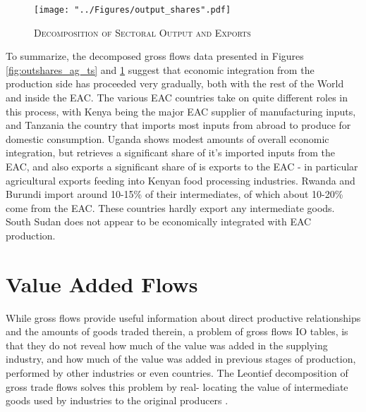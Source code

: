 \documentclass[a4paper]{article}
\begin{document}
\begin{figure}[!h]
\centering
\vspace{-2cm}
\caption{\label{fig:outshares}\textsc{Decomposition of Sectoral Output and Exports}}
\vspace*{\fill}
\begin{adjustbox}{center}
\texttt{[image: "../Figures/output\_shares".pdf]} %
\end{adjustbox}
\vspace*{\fill}
\end{figure}
\FloatBarrier

To summarize, the decomposed gross flows data presented in Figures \ref{fig:outshares_ag_ts} and \ref{fig:outshares} suggest that economic integration from the production side has proceeded very gradually, both with the rest of the World and inside the EAC. The various EAC countries take on quite different roles in this process, with Kenya being the major EAC supplier of manufacturing inputs, and Tanzania the country that imports most inputs from abroad to produce for domestic consumption. Uganda shows modest amounts of overall economic integration, but retrieves a significant share of it's imported inputs from the EAC, and also exports a significant share of is exports to the EAC - in particular agricultural exports feeding into Kenyan food processing industries. Rwanda and Burundi import around 10-15\% of their intermediates, of which about 10-20\% come from the EAC. These countries hardly export any intermediate goods. South Sudan does not appear to be economically integrated with EAC production. 


\section{Value Added Flows}
While gross flows provide useful information about direct productive relationships and the amounts of goods traded therein, a problem of gross flows IO tables, is that they do not reveal how much of the value was added in the supplying industry, and how much of the value was added in previous stages of production, performed by other industries or even countries. %
The Leontief decomposition of gross trade flows solves this problem by real-
locating the value of intermediate goods used by industries to the original producers \citep{Kummritz2014}. %
\end{document}
